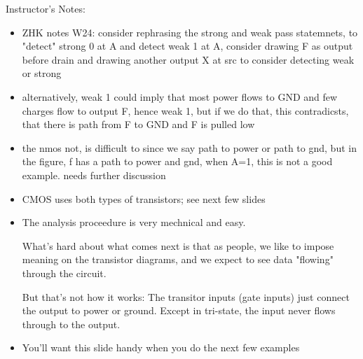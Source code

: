 \BNotes\ifnum{}
\begin{frame}[fragile]
Instructor's Notes:
\begin{itemize}
\item ZHK notes W24: consider rephrasing the strong and weak pass statemnets, to "detect" strong 0 at A and detect weak 1 at A, consider drawing F as output before drain and drawing another output X at src to consider detecting weak or strong 
\item alternatively, weak 1 could imply that most power flows to GND and few charges flow to output F, hence weak 1, but if we do that, this contradicsts, that there is path from F to GND and F is pulled low 
\item the nmos not, is difficult to since we say path to power or path to gnd, but in the figure, f has a path to power and gnd, when A=1, this is not a good example. needs further discussion 
	\item CMOS uses both types of transistors; see next few slides
	\item The analysis proceedure is very mechnical and easy.

		What's hard about what comes next is that as people, we
		like to impose meaning on the transistor diagrams, and
		we expect to see data "flowing" through the circuit.

		But that's not how it works: The transitor inputs (gate
		inputs) just connect the output to power or ground.
		Except in tri-state, the input never flows through to the
		output.
	\item You'll want this slide handy when you do the next few examples
\end{itemize}
\end{frame}
\fi\ENotes

